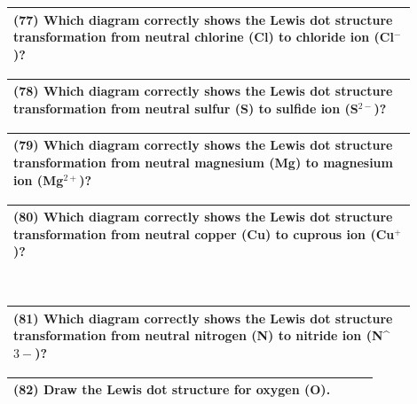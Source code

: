 \documentclass{article}
\begin{document}
\noindent
\begin{tabular}{|p{0.9\linewidth}|}
\hline
\textbf{(77)} Which diagram correctly shows the Lewis dot structure transformation from neutral chlorine (Cl) to chloride ion (Cl$^{-}$)? \\
\hline
\end{tabular}


\vspace{0.2cm}
\noindent
\begin{tabular}{|p{0.9\linewidth}|}
\hline
\textbf{(78)} Which diagram correctly shows the Lewis dot structure transformation from neutral sulfur (S) to sulfide ion (S$^{2-}$)? \\
\hline
\end{tabular}


\vspace{0.2cm}
\noindent
\begin{tabular}{|p{0.9\linewidth}|}
\hline
\textbf{(79)} Which diagram correctly shows the Lewis dot structure transformation from neutral magnesium (Mg) to magnesium ion (Mg$^{2+}$)? \\
\hline
\end{tabular}


\vspace{0.2cm}
\noindent
\begin{tabular}{|p{0.9\linewidth}|}
\hline
\textbf{(80)} Which diagram correctly shows the Lewis dot structure transformation from neutral copper (Cu) to cuprous ion (Cu$^{+}$)? \\
\hline
\end{tabular}\\

\vspace{0.2cm}
\noindent
\begin{tabular}{|p{0.9\linewidth}|}
\hline
\textbf{(81)} Which diagram correctly shows the Lewis dot structure transformation from neutral nitrogen (N) to nitride ion (N^${3-}$)? \\
\hline
\end{tabular}
\newpage

\noindent
\begin{tabular}{|p{0.9\linewidth}|}
\hline
\vspace{0.2cm}
\textbf{(82)} Draw the Lewis dot structure for oxygen (O). \\
\hline
\end{tabular}
\end{document}
